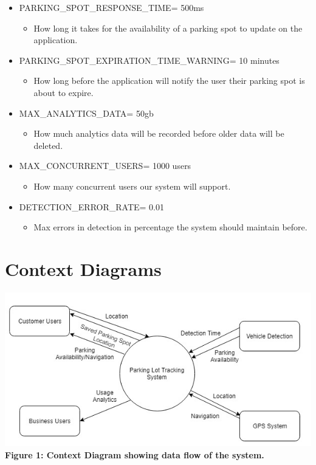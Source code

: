 \documentclass[]{article}
\begin{document}
\begin{itemize}
	\item PARKING\_SPOT\_RESPONSE\_TIME= 500ms 
	\begin{itemize}
		\item How long it takes for the availability of a parking spot to update on the application.
	\end{itemize}

	\item PARKING\_SPOT\_EXPIRATION\_TIME\_WARNING= 10 minutes
	\begin{itemize}
		\item How long before the application will notify the user their parking spot is about to expire.
	\end{itemize}

	\item MAX\_ANALYTICS\_DATA= 50gb
	\begin{itemize}
		\item How much analytics data will be recorded before older data will be deleted.
	\end{itemize}

	\item MAX\_CONCURRENT\_USERS= 1000 users
	\begin{itemize}
		\item How many concurrent users our system will support.
	\end{itemize}

	\item DETECTION\_ERROR\_RATE= 0.01%
	\begin{itemize}
		\item Max errors in detection in percentage the system should maintain before.
	\end{itemize}
\end{itemize}
\section{Context Diagrams}

\graphicspath{ {./images/} }
	\begin{center}
		\includegraphics{context-diagram}
		\textbf{Figure 1: Context Diagram showing data flow of the system.}
	\end{center}
\end{document}
